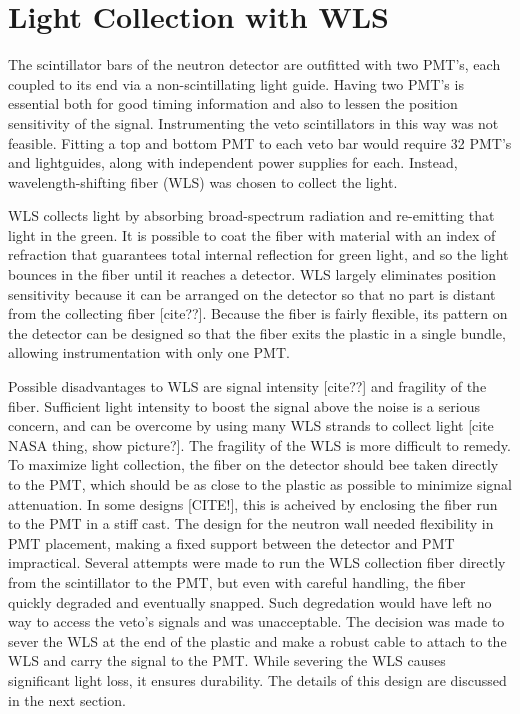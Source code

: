 \section{Light Collection with WLS}

The scintillator bars of the neutron detector are outfitted with two PMT's, each coupled to its end via a non-scintillating light guide.  Having two PMT's is essential both for good timing information and also to lessen the position sensitivity of the signal.  Instrumenting the veto scintillators in this way was not feasible.  Fitting a top and bottom PMT to each veto bar would require 32 PMT's and lightguides, along with independent power supplies for each.  Instead, wavelength-shifting fiber (WLS) was chosen to collect the light.

WLS collects light by absorbing broad-spectrum radiation and re-emitting that light in the green.  It is possible to coat the fiber with material with an index of refraction that guarantees total internal reflection for green light, and so the light bounces in the fiber until it reaches a detector.  WLS largely eliminates position sensitivity because it can be arranged on the detector so that no part is distant from the collecting fiber [cite??].  Because the fiber is fairly flexible, its pattern on the detector can be designed so that the fiber exits the plastic in a single bundle, allowing instrumentation with only one PMT.

Possible disadvantages to WLS are signal intensity [cite??] and fragility of the fiber.  Sufficient light intensity to boost the signal above the noise is a serious concern, and can be overcome by using many WLS strands to collect light [cite NASA thing, show picture?].  The fragility of the WLS is more difficult to remedy.  To maximize light collection, the fiber on the detector should bee taken directly to the PMT, which should be as close to the plastic as possible to minimize signal attenuation.  In some designs [CITE!], this is acheived by enclosing the fiber run to the PMT in a stiff cast.  The design for the neutron wall needed flexibility in PMT placement, making a fixed support between the detector and PMT impractical.  Several attempts were made to run the WLS collection fiber directly from the scintillator to the PMT, but even with careful handling, the fiber quickly degraded and eventually snapped.  Such degredation would have left no way to access the veto's signals and was unacceptable.  The decision was made to sever the WLS at the end of the plastic and make a robust cable to attach to the WLS and carry the signal to the PMT.  While severing the WLS causes significant light loss, it ensures durability.  The details of this design are discussed in the next section.  

